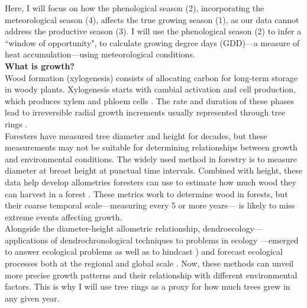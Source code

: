 \documentclass{article}
\begin{document}
Here, I will focus on how the phenological season (2), incorporating the meteorological season (4), affects the true growing season (1), as our data cannot address the productive season (3). I will use the phenological season (2) to infer a ``window of opportunity", to calculate growing degree days (GDD)---a measure of heat accumulation---using meteorological conditions. \\

\textbf{What is growth?} \\ 
Wood formation (xylogenesis) consists of allocating carbon for long-term storage in woody plants. Xylogenesis starts with cambial activation and cell production, which produces xylem and phloem cells
\citep{etzold_number_2022,silvestro_roots_2025}. The rate and duration of these phases lead to irreversible radial growth increments usually represented through tree rings \citep{plomion_wood_2001,rathgeber_biological_2016}. \\

Foresters have measured tree diameter and height for decades, but these measurements may not be suitable for determining relationships between growth and environmental conditions. 
The widely used method in forestry is to measure diameter at breast height at punctual time intervals. Combined with height, these data help develop allometries foresters can use to estimate how much wood they can harvest in a forest \citep[e.g.,][]{meyer_mathematical_1940,saunders_height-diameter_2008}. These metrics work to determine wood in forests, but their coarse temporal scale---measuring every 5 or more years--- is likely to miss extreme events affecting growth. \\

Alongside the diameter-height allometric relationship, dendroecology---applications of dendrochronological techniques to problems in ecology \citep{fritts_dendroecology_1989}---emerged to answer ecological problems as well as to hindcast \citep[e.g.,][]{bergeron_fire_2004}) and forecast ecological processes both at the regional \citep{gazol_forest_2018} and global scale \citep{manzanedo_towards_2019, buntgen_tree_2018}. Now, these methods can unveil more precise growth patterns and their relationship with different environmental factors. This is why I will use tree rings as a proxy for how much trees grew in any given year.\\

\end{document}
